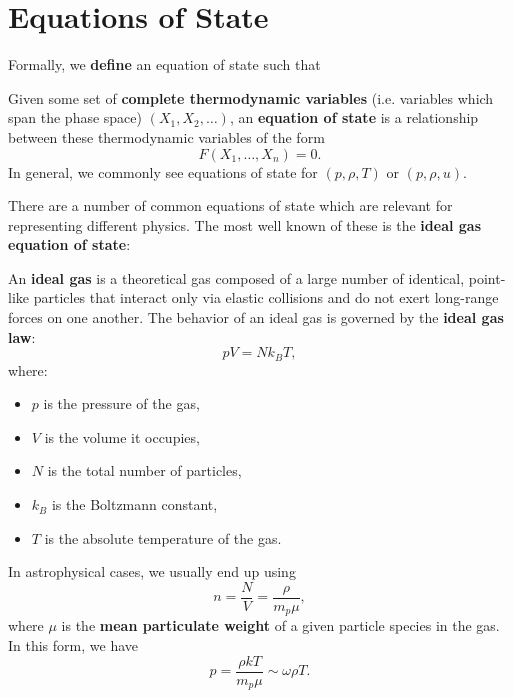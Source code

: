 \section{Equations of State}

Formally, we \textbf{define} an equation of state such that
\vspace{0.25cm}
\begin{definition}
    Given some set of \textbf{complete thermodynamic variables} (i.e. variables which span the phase space) $(X_1,X_2,\ldots)$, an \textbf{equation of state} is a relationship between these thermodynamic variables of the form
    \begin{equation}
        \label{eq:general_eos}
        F(X_1,\ldots,X_n) = 0.
    \end{equation}
    In general, we commonly see equations of state for $(p, \rho, T)$ or $(p,\rho,u)$.
\end{definition}
\vspace{0.25cm}
There are a number of common equations of state which are relevant for representing different physics. The most well known of these is the \textbf{ideal gas equation of state}:
\vspace{0.25cm}
\begin{definition}
An \textbf{ideal gas} is a theoretical gas composed of a large number of identical, point-like particles that interact only via elastic collisions and do not exert long-range forces on one another. The behavior of an ideal gas is governed by the \textbf{ideal gas law}:
\[
pV = Nk_B T,
\]
where:
\begin{itemize}
    \item $p$ is the pressure of the gas,
    \item $V$ is the volume it occupies,
    \item $N$ is the total number of particles,
    \item $k_B$ is the Boltzmann constant,
    \item $T$ is the absolute temperature of the gas.
\end{itemize}
\end{definition}
\vspace{0.25cm}
In astrophysical cases, we usually end up using
\[
n = \frac{N}{V} = \frac{\rho}{m_p\mu},
\]
where $\mu$ is the \textbf{mean particulate weight} of a given particle species in the gas. In this form, we have
\begin{equation}
    \label{eq:ideal_gas}
    \boxed{
    p = \frac{\rho k T}{m_p\mu} \sim \omega \rho T.
    }
\end{equation}
